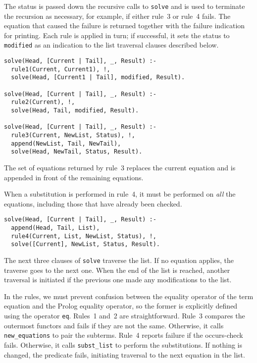 \documentclass[11pt]{article}
\newcommand*{\p}[1]{\textup{\texttt{#1}}}
\begin{document}
The status is passed down the recursive calls to \p{solve} and is used
to terminate the recursion as necessary, for example, if either rule~3
or rule~4 fails. The equation that caused the failure is returned
together with the failure indication for printing. Each rule is applied
in turn; if successful, it sets the status to \p{modified} as an
indication to the list traversal clauses described below.

\begin{verbatim}
solve(Head, [Current | Tail], _, Result) :-
  rule1(Current, Current1), !,
  solve(Head, [Current1 | Tail], modified, Result).

solve(Head, [Current | Tail], _, Result) :-
  rule2(Current), !,
  solve(Head, Tail, modified, Result).

solve(Head, [Current | Tail], _, Result) :-
  rule3(Current, NewList, Status), !,
  append(NewList, Tail, NewTail),
  solve(Head, NewTail, Status, Result).
\end{verbatim}

The set of equations returned by rule~3 replaces the current equation
and is appended in front of the remaining equations.

When a substitution is performed in rule~4, it must be performed on
\emph{all} the equations, including those that have already been
checked.

\begin{verbatim}
solve(Head, [Current | Tail], _, Result) :-
  append(Head, Tail, List),
  rule4(Current, List, NewList, Status), !,
  solve([Current], NewList, Status, Result).
\end{verbatim}

The next three clauses of \p{solve} traverse the list. If no equation
applies, the traverse goes to the next one. When the end of the list is
reached, another traversal is initiated if the previous one made any
modifications to the list.

In the rules, we must prevent confusion between the equality operator of
the term equation and the Prolog equality operator, so the former is
explicitly defined using the operator \p{eq}. Rules~1 and~2 are
straightforward. Rule~3 compares the outermost functors and fails if
they are not the same. Otherwise, it calls \p{new\_equations} to pair
the subterms. Rule~4 reports failure if the occurs-check fails.
Otherwise, it calls \p{subst\_list} to perform the substitutions. If
nothing is changed, the predicate fails, initiating traversal to the
next equation in the list.
\end{document}
